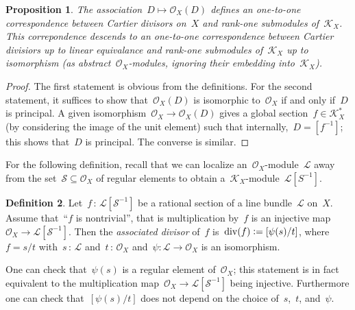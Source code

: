 \documentclass[10pt]{amsart}
\theoremstyle{definition}
\newtheorem{defn}{Definition}[section]
\theoremstyle{plain}
\newtheorem{prop}[defn]{Proposition}
\theoremstyle{remark}
\newtheorem{rem}[defn]{Remark}
\renewcommand{\O}{\mathcal{O}}
\newcommand{\K}{\mathcal{K}}
\renewcommand{\L}{\mathcal{L}}
\renewcommand{\S}{\mathcal{S}}
\newcommand{\?}{\,{:}\,}
\renewcommand{\_}{\mathpunct{.}\,}
\newcommand{\defeq}{\vcentcolon=}
\begin{document}
\begin{prop}The association~$D \mapsto \O_X(D)$ defines an one-to-one
correspondence between Cartier divisors on~$X$ and rank-one submodules
of~$\K_X$. This correpondence descends to an one-to-one correspondence between
Cartier divisiors up to linear equivalance and rank-one submodules of~$\K_X$ up
to isomorphism (as abstract~$\O_X$-modules, ignoring their embedding
into~$\K_X$).\end{prop}
\begin{proof}The first statement is obvious from the definitions. For the
second statement, it suffices to show that~$\O_X(D)$ is isomorphic to~$\O_X$ if
and only if~$D$ is principal. A given isomorphism~$\O_X \to \O_X(D)$ gives a
global section~$f \in \K_X^*$ (by considering the image of the unit element)
such that internally,~$D = [f^{-1}]$; this shows that~$D$ is principal. The
converse is similar.
\end{proof}


For the following definition, recall that we can localize an~$\O_X$-module~$\L$
away from the set~$\S \subseteq \O_X$ of regular elements to obtain
a~$\K_X$-module~$\L[S^{-1}]$.

\begin{defn}Let~$f\?\L[\S^{-1}]$ be a rational section of a line bundle~$\L$
on~$X$. Assume that~``$f$ is nontrivial'', that is multiplication by~$f$ is an
injective map~$\O_X \to \L[\S^{-1}]$. Then the \emph{associated divisor} of~$f$
is~$\operatorname{div}(f) \defeq [\psi(s)/t]$, where~$f = s/t$ with~$s\?\L$ and~$t\?\O_X$
and~$\psi : \L \to \O_X$ is an isomorphism.\end{defn}

One can check that~$\psi(s)$ is a regular element of~$\O_X$; this statement is
in fact equivalent to the multiplication map~$\O_X \to \L[\S^{-1}]$ being
injective. Furthermore one can check that~$[\psi(s)/t]$ does not depend on the
choice of~$s$,~$t$, and~$\psi$.
\end{document}
